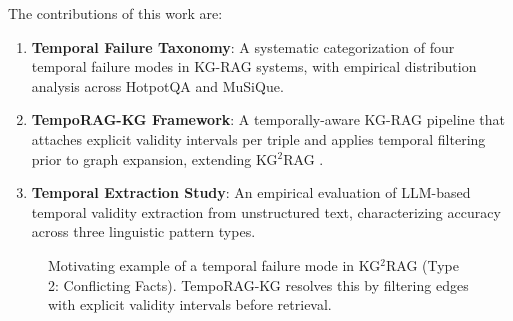 \documentclass[11pt]{article}
\begin{document}
The contributions of this work are:
\begin{enumerate}
  \item \textbf{Temporal Failure Taxonomy}: A systematic categorization of
        four temporal failure modes in KG-RAG systems, with empirical
        distribution analysis across HotpotQA and MuSiQue.
  \item \textbf{TempoRAG-KG Framework}: A temporally-aware KG-RAG pipeline
        that attaches explicit validity intervals per triple and applies
        temporal filtering prior to graph expansion, extending
        KG$^2$RAG \cite{zhu2025kg2rag}.
  \item \textbf{Temporal Extraction Study}: An empirical evaluation of
        LLM-based temporal validity extraction from unstructured text,
        characterizing accuracy across three linguistic pattern types.
\end{enumerate}

\begin{figure}[t]
  \centering
  \caption{Motivating example of a temporal failure mode in KG$^2$RAG
  (Type 2: Conflicting Facts). TempoRAG-KG resolves this by filtering
  edges with explicit validity intervals before retrieval.}
  \label{fig:motivation}
\end{figure}
\end{document}
